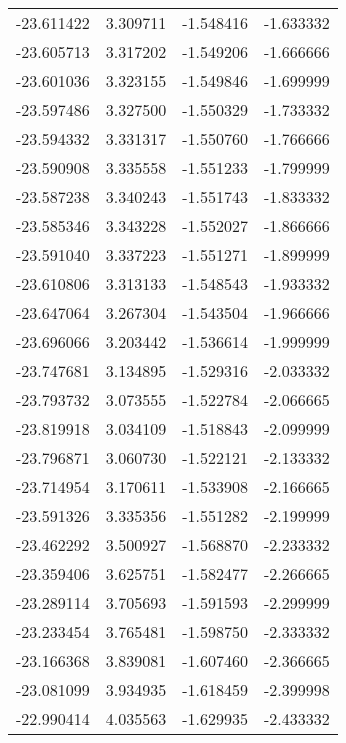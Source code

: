 \begin{tabular}{rrrr}
      -23.611422 &         3.309711 &   -1.548416 &  -1.633332 \\
      -23.605713 &         3.317202 &   -1.549206 &  -1.666666 \\
      -23.601036 &         3.323155 &   -1.549846 &  -1.699999 \\
      -23.597486 &         3.327500 &   -1.550329 &  -1.733332 \\
      -23.594332 &         3.331317 &   -1.550760 &  -1.766666 \\
      -23.590908 &         3.335558 &   -1.551233 &  -1.799999 \\
      -23.587238 &         3.340243 &   -1.551743 &  -1.833332 \\
      -23.585346 &         3.343228 &   -1.552027 &  -1.866666 \\
      -23.591040 &         3.337223 &   -1.551271 &  -1.899999 \\
      -23.610806 &         3.313133 &   -1.548543 &  -1.933332 \\
      -23.647064 &         3.267304 &   -1.543504 &  -1.966666 \\
      -23.696066 &         3.203442 &   -1.536614 &  -1.999999 \\
      -23.747681 &         3.134895 &   -1.529316 &  -2.033332 \\
      -23.793732 &         3.073555 &   -1.522784 &  -2.066665 \\
      -23.819918 &         3.034109 &   -1.518843 &  -2.099999 \\
      -23.796871 &         3.060730 &   -1.522121 &  -2.133332 \\
      -23.714954 &         3.170611 &   -1.533908 &  -2.166665 \\
      -23.591326 &         3.335356 &   -1.551282 &  -2.199999 \\
      -23.462292 &         3.500927 &   -1.568870 &  -2.233332 \\
      -23.359406 &         3.625751 &   -1.582477 &  -2.266665 \\
      -23.289114 &         3.705693 &   -1.591593 &  -2.299999 \\
      -23.233454 &         3.765481 &   -1.598750 &  -2.333332 \\
      -23.166368 &         3.839081 &   -1.607460 &  -2.366665 \\
      -23.081099 &         3.934935 &   -1.618459 &  -2.399998 \\
      -22.990414 &         4.035563 &   -1.629935 &  -2.433332 \\

\end{tabular}
